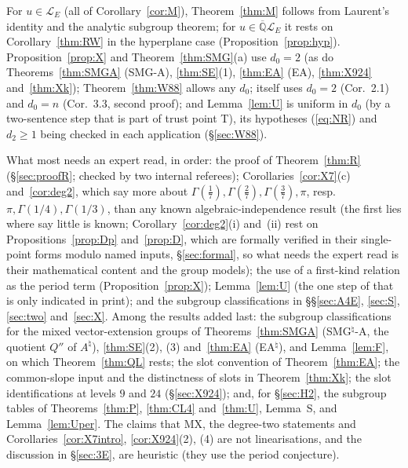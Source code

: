 \documentclass[11pt]{amsart}
\theoremstyle{definition}
\newcommand{\Qb}{\overline{\mathbb{Q}}}
\newcommand{\Lg}{\mathcal{L}}
\begin{document}
For $u\in\Lg_E$ (all of Corollary~\ref{cor:M}), Theorem~\ref{thm:M} follows from Laurent's identity and the analytic
subgroup theorem; for $u\in\Qb\Lg_E$ it rests on Corollary~\ref{thm:RW} in the hyperplane case
(Proposition~\ref{prop:hyp}). Proposition~\ref{prop:X} and Theorem~\ref{thm:SMG}(a) use $d_0=2$ (as do Theorems~\ref{thm:SMGA} (SMG-A),
\ref{thm:SE}(1), \ref{thm:EA} (EA), \ref{thm:X924} and~\ref{thm:Xk}); Theorem~\ref{thm:W88} allows any $d_0$;
\cite{W88} itself uses $d_0=2$ (Cor.~2.1) and $d_0=n$ (Cor.~3.3, second proof); and Lemma~\ref{lem:U} is uniform in $d_0$
(by a two-sentence step that is part of trust point T), its hypotheses (\ref{eq:NR}) and $d_2\ge1$ being checked in each
application (\S\ref{sec:W88}).

What most needs an expert read, in order: the proof of Theorem~\ref{thm:R} (\S\ref{sec:proofR}; checked by two
internal referees); Corollaries~\ref{cor:X7}(c) and~\ref{cor:deg2}, which say more about
$\Gamma(\frac17),\Gamma(\frac27),\Gamma(\frac37),\pi$, resp.\ $\pi,\Gamma(1/4),\Gamma(1/3)$, than any known
algebraic-independence result (the first lies where \cite{GUY,GU} say little is known; Corollary~\ref{cor:deg2}(i)
and~(ii) rest on Propositions~\ref{prop:Dp} and~\ref{prop:D}, which are formally verified in their single-point forms modulo
named inputs, \S\ref{sec:formal}, so what needs the expert read is their mathematical content and the group models); the
use of a first-kind relation as the period term (Proposition~\ref{prop:X}); Lemma~\ref{lem:U} (the one step of
\cite[Prop.~6.1]{W88} that is only indicated in print); and the subgroup classifications in \S\S\ref{sec:A4E},
\ref{sec:S}, \ref{sec:two} and~\ref{sec:X}. Among the results added last: the subgroup classifications for the mixed
vector-extension groups of Theorems~\ref{thm:SMGA} (SMG$^\natural$-A, the quotient $Q''$ of $A^\natural$),
\ref{thm:SE}(2), (3) and~\ref{thm:EA} (EA$^\natural$), and Lemma~\ref{lem:F}, on which Theorem~\ref{thm:QL} rests; the slot
convention of Theorem~\ref{thm:EA}; the common-slope input and the distinctness of slots in Theorem~\ref{thm:Xk}; the
slot identifications at levels $9$ and $24$ (\S\ref{sec:X924}); and, for \S\ref{sec:H2}, the subgroup tables of
Theorems~\ref{thm:P}, \ref{thm:CL4} and~\ref{thm:U}, Lemma~S, and Lemma~\ref{lem:Uper}. The claims that MX, the degree-two statements and
Corollaries~\ref{cor:X7intro}, \ref{cor:X924}(2), (4) are not linearisations, and the discussion in \S\ref{sec:3E}, are heuristic (they use the period conjecture).
\end{document}
